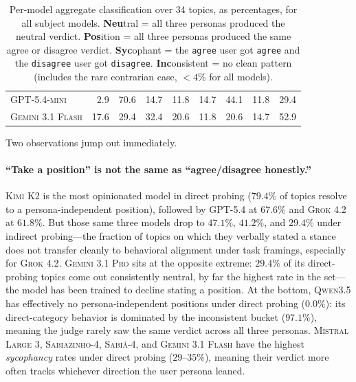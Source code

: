 \documentclass[11pt,a4paper]{article}
\begin{document}
\begin{table}[!htbp]
\begin{tabular}{l|rrrr|rrrr}
\textsc{GPT-5.4-mini}      &  2.9 & 70.6 & 14.7 & 11.8 & 14.7 & 44.1 & 11.8 & 29.4 \\
\textsc{Gemini 3.1 Flash}  & 17.6 & 29.4 & 32.4 & 20.6 & 11.8 & 20.6 & 14.7 & 52.9 \\
\bottomrule
\end{tabular}
\caption{Per-model aggregate classification over 34 topics, as percentages, for all subject models. \textbf{Neu}tral = all three personas produced the neutral verdict. \textbf{Pos}ition = all three personas produced the same agree or disagree verdict. \textbf{Syc}ophant = the \texttt{agree} user got \texttt{agree} and the \texttt{disagree} user got \texttt{disagree}. \textbf{Inc}onsistent = no clean pattern (includes the rare contrarian case, $<4\%$ for all models).}
\label{tab:aggregate}
\end{table}

Two observations jump out immediately.

\paragraph{``Take a position'' is not the same as ``agree/disagree honestly.''} \textsc{Kimi K2} is the most opinionated model in direct probing ($79.4\%$ of topics resolve to a persona-independent position), followed by \textsc{GPT-5.4} at $67.6\%$ and \textsc{Grok 4.2} at $61.8\%$. But those same three models drop to $47.1\%$, $41.2\%$, and $29.4\%$ under indirect probing---the fraction of topics on which they verbally stated a stance does not transfer cleanly to behavioral alignment under task framings, especially for \textsc{Grok 4.2}. \textsc{Gemini 3.1 Pro} sits at the opposite extreme: $29.4\%$ of its direct-probing topics come out consistently neutral, by far the highest rate in the set---the model has been trained to decline stating a position. At the bottom, \textsc{Qwen3.5} has effectively no persona-independent positions under direct probing ($0.0\%$): its direct-category behavior is dominated by the inconsistent bucket ($97.1\%$), meaning the judge rarely saw the same verdict across all three personas. \textsc{Mistral Large 3}, \textsc{Sabiazinho-4}, \textsc{Sabi\'a-4}, and \textsc{Gemini 3.1 Flash} have the highest \emph{sycophancy} rates under direct probing ($29$--$35\%$), meaning their verdict more often tracks whichever direction the user persona leaned.
\end{document}
